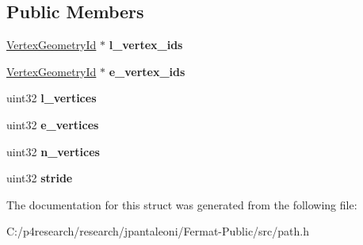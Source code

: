\subsection*{Public Members}
\begin{DoxyCompactItemize}
\item 
\mbox{\label{struct_bidir_path_a703d1dd91d148b8bd87ef34ae00e2f19}} 
\hyperlink{struct_vertex_geometry_id}{Vertex\+Geometry\+Id} $\ast$ {\bfseries l\+\_\+vertex\+\_\+ids}
\item 
\mbox{\label{struct_bidir_path_ae7d4e6360eb4a6301775c798c53d16db}} 
\hyperlink{struct_vertex_geometry_id}{Vertex\+Geometry\+Id} $\ast$ {\bfseries e\+\_\+vertex\+\_\+ids}
\item 
\mbox{\label{struct_bidir_path_a5886363130c68a71077094cb81446d0c}} 
uint32 {\bfseries l\+\_\+vertices}
\item 
\mbox{\label{struct_bidir_path_ae086812bce22f2da3e69f5129ef58cd6}} 
uint32 {\bfseries e\+\_\+vertices}
\item 
\mbox{\label{struct_bidir_path_a5afbcddf1256b231b65fe95ab1c9c067}} 
uint32 {\bfseries n\+\_\+vertices}
\item 
\mbox{\label{struct_bidir_path_ac9d532ad1c5720cea9f0fec0884801c7}} 
uint32 {\bfseries stride}
\end{DoxyCompactItemize}


The documentation for this struct was generated from the following file\+:\begin{DoxyCompactItemize}
\item 
C\+:/p4research/research/jpantaleoni/\+Fermat-\/\+Public/src/path.\+h\end{DoxyCompactItemize}
